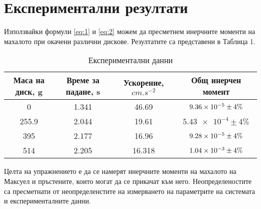 \documentclass[aps, prb, twocolumn, a4paper, floatfix, reprint]{revtex4-2}
\begin{document}
\section{Експериментални резултати}
Използвайки формули \eqref{eq:1} и \eqref{eq:2} можем да пресметнем инерчните моменти на махалото при окачени различни дискове. Резултатите са представени в Таблица 1.  

\begin{table}[H]
    \label{tab:1}
    \caption{Експериментални данни}
    \begin{ruledtabular}
        \begin{tabular}{*{4}{c}}
            \multicolumn{1}{p{2cm}}{Маса на диск, g} &
            \multicolumn{1}{p{2cm}}{Време за падане, s} &
            \multicolumn{1}{p{2cm}}{Ускорение, $cm.s^{-2}$} &
            \multicolumn{1}{p{2cm}}{Общ инерчен момент} \\[2pt] 
            \midrule
            0 & 1.341 & 46.69 & $\num{9.36E-5} \pm 4\%$ \\ 
            255.9 & 2.044 & 19.61 & $\num{5.43e-4} \pm 4\%$ \\
            395 & 2.177 & 16.96 & $\num{9.28E-5} \pm 4\%$ \\
            514 & 2.205 & 16.318 & $\num{1.04E-3} \pm 4\%$ \\
        \end{tabular}
    \end{ruledtabular}
\end{table}
Целта на упражнението е да се намерят инерчните моменти на махалото на Максуел и пръстените, които могат да се прикачат към него. Неопределеностите са пресметнати от неопределенстите на измерването на параметрите на системата и експерименталните данни.
\end{document}
